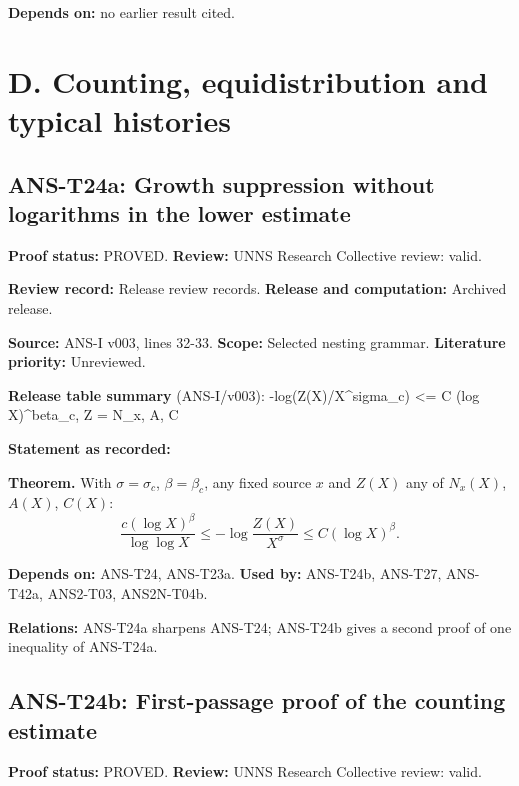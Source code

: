 \documentclass[
  11pt,
]{article}
\begin{document}
\textbf{Depends on:} no earlier result cited.

\hypertarget{d.-counting-equidistribution-and-typical-histories}{%
\section{D. Counting, equidistribution and typical
histories}\label{d.-counting-equidistribution-and-typical-histories}}

\hypertarget{ans-t24a-growth-suppression-without-logarithms-in-the-lower-estimate}{%
\subsection{ANS-T24a: Growth suppression without logarithms in the lower
estimate}\label{ans-t24a-growth-suppression-without-logarithms-in-the-lower-estimate}}

\textbf{Proof status:} PROVED. \textbf{Review:} UNNS Research Collective
review: valid.

\textbf{Review record:} Release review records. \textbf{Release and
computation:} Archived release.

\textbf{Source:} ANS-I v003, lines 32-33. \textbf{Scope:} Selected
nesting grammar. \textbf{Literature priority:} Unreviewed.

\textbf{Release table summary} (ANS-I/v003): -log(Z(X)/X\^{}sigma\_c)
\textless= C (log X)\^{}beta\_c, Z = N\_x, A, C

\textbf{Statement as recorded:}

\textbf{Theorem.} With \(\sigma=\sigma_c\), \(\beta=\beta_c\), any fixed
source \(x\) and \(Z(X)\) any of \(N_x(X)\), \(A(X)\), \(C(X)\):
\[\frac{c(\log X)^{\beta}}{\log\log X}\le-\log\frac{Z(X)}{X^{\sigma}}\le C(\log X)^{\beta}.\]

\textbf{Depends on:} ANS-T24, ANS-T23a. \textbf{Used by:} ANS-T24b,
ANS-T27, ANS-T42a, ANS2-T03, ANS2N-T04b.

\textbf{Relations:} ANS-T24a sharpens ANS-T24; ANS-T24b gives a second
proof of one inequality of ANS-T24a.

\hypertarget{ans-t24b-first-passage-proof-of-the-counting-estimate}{%
\subsection{ANS-T24b: First-passage proof of the counting
estimate}\label{ans-t24b-first-passage-proof-of-the-counting-estimate}}

\textbf{Proof status:} PROVED. \textbf{Review:} UNNS Research Collective
review: valid.
\end{document}
